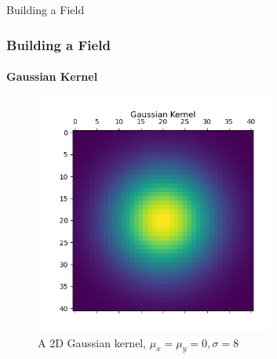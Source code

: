 \documentclass[professionalfont,10pt]{beamer}
\begin{document}
	\begin{frame}[t]{Building a Field}
		\frametitle{Building a Field}
		\framesubtitle{Gaussian Kernel}
		\hskip-0.75cm
		\begin{minipage}[t]{0.2\linewidth}\vspace{-0.5cm}
			\tiny\tableofcontents[currentsection,currentsubsection,hideothersubsections,subsectionstyle=show/shaded]
		\end{minipage}
		\hfill%
		\begin{minipage}[t]{0.86\linewidth}\vspace{-0.5cm}
			\begin{figure}[t]
				\centering
				\captionsetup{width=0.9\textwidth}
				\includegraphics[width=0.7\textwidth]{../images/GaussianKernel.png}
				\caption{A 2D Gaussian kernel, $\mu_x = \mu_y = 0, \sigma = 8$}
			\end{figure}
		\end{minipage}
		\vfill%
	\end{frame}
	
\end{document}
